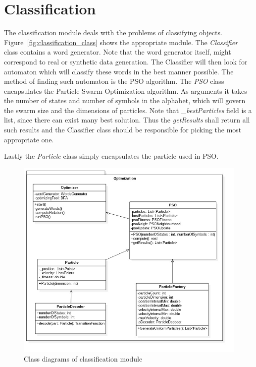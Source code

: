 \documentclass{mini}
\begin{document}

\newpage
\section{Classification}

The classification module deals with the problems of classifying objects. Figure~\ref{fig:classification_class} shows the appropriate module. The \textit{Classifier} class contains a word generator. Note that the word generator itself, might correspond to real or synthetic data generation. The Classifier will then look for automaton which will classify these words in the best manner possible. The method of finding such automaton is the PSO algorithm. The \textit{PSO} class encapsulates the Particle Swarm Optimization algorithm. As arguments it takes the number of states and number of symbols in the alphabet, which will govern the swarm size and the dimensions of particles. Note that \textit{\_bestParticles} field is a list, since there can exist many best solution. Thus the \textit{getResults} shall return all such results and the Classifier class should be responsible for picking the most appropriate one.

Lastly the \textit{Particle} class simply encapsulates the particle used in PSO.

%
%
\begin{figure}[H]
    \centering
    \includegraphics[width=1.0\textwidth]{../uml/classes/optimizationMain.jpg}
    \caption{Class diagrams of classification module}
    \label{fig:classification_main_class}
\end{figure}
\end{document}
